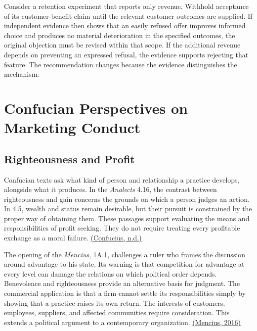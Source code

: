 Consider a retention experiment that reports only revenue. Withhold
acceptance of its customer-benefit claim until the relevant customer
outcomes are supplied. If independent evidence then shows that an easily
refused offer improves informed choice and produces no material
deterioration in the specified outcomes, the original objection must be
revised within that scope. If the additional revenue depends on
preventing an expressed refusal, the evidence supports rejecting that
feature. The recommendation changes because the evidence distinguishes
the mechanism.


\hypertarget{M09-confucian-perspectives-on-marketing-conduct}{%
\section{Confucian Perspectives on Marketing
Conduct}\label{M09-confucian-perspectives-on-marketing-conduct}}

\noindent \hypertarget{M09-righteousness-and-profit}{%
\subsection{Righteousness and
Profit}\label{M09-righteousness-and-profit}}

\noindent \noindent Confucian texts ask what kind of person and relationship a
practice develops, alongside what it produces. In the \emph{Analects}
4.16, the contrast between righteousness and gain concerns the grounds
on which a person judges an action. In 4.5, wealth and status remain
desirable, but their pursuit is constrained by the proper way of
obtaining them. These passages support evaluating the means and
responsibilities of profit seeking. They do not require treating every
profitable exchange as a moral failure.
\href{https://www.gutenberg.org/cache/epub/3330/pg3330-images.html}{(Confucius,
n.d.)}

The opening of the \emph{Mencius}, 1A.1, challenges a ruler who frames
the discussion around advantage to his state. Its warning is that
competition for advantage at every level can damage the relations on
which political order depends. Benevolence and righteousness provide an
alternative basis for judgment. The commercial application is that a
firm cannot settle its responsibilities simply by showing that a
practice raises its own return. The interests of customers, employees,
suppliers, and affected communities require consideration. This extends
a political argument to a contemporary organization.
\href{https://scholarworks.iu.edu/iuswrrest/api/core/bitstreams/265d73a0-6bfa-45df-92ff-4e7d3f8be4b1/content}{(Mencius,
2016)}

